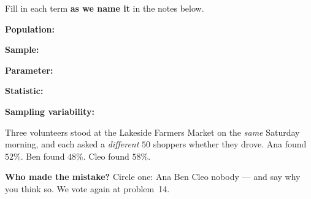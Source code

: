\documentclass[12pt]{article}
\newcommand{\termrowheight}{2.3cm}
\newlength{\termrowinset}\setlength{\termrowinset}{7pt}
\newcommand{\vterm}[1]{%
  \par\noindent\begin{minipage}[t][\termrowheight][t]{\linewidth}%
    \vspace*{\termrowinset}%
    \textbf{\textcolor{cerulean}{#1:}}%
  \end{minipage}\par}
\begin{document}

\vspace{0.15in}

\begin{vocabbox}
\small
Fill in each term \textbf{as we name it} in the notes below.
\vterm{Population}
\vterm{Sample}
\vterm{Parameter}
\vterm{Statistic}
\vterm{Sampling variability}
\end{vocabbox}

\boxguard[12]
\begin{hookbox}
\small
Three volunteers stood at the Lakeside Farmers Market on the \emph{same} Saturday morning, and
each asked a \emph{different} $50$ shoppers whether they drove. Ana found $52\%$. Ben found
$48\%$. Cleo found $58\%$.

\vspace{3pt}
\textbf{Who made the mistake?} Circle one: \quad Ana \qquad Ben \qquad Cleo \qquad nobody
\quad --- and say why you think so. We vote again at problem~14.
\par{}
\end{hookbox}
\end{document}
